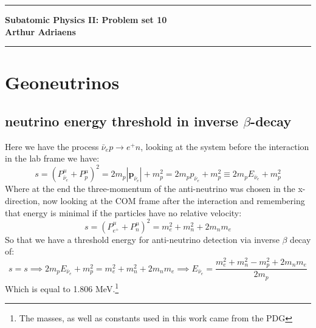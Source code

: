 \documentclass[10pt,a4paper,twoside]{article}
\begin{document}
	\begin{center}
		\hrule
		\vspace{.4cm}
		{\bf {\huge Subatomic Physics II: Problem set 10}}
		\vspace{.2cm}
		\\
		{\bf Arthur Adriaens}
		\vspace{.2cm}
		\hrule
	\end{center}
\section{Geoneutrinos}
\subsection{neutrino energy threshold in inverse $\beta$-decay}
Here we have the process $\bar{\nu}_ep\rightarrow e^+n$, looking at the system before the interaction in the lab frame we have:
\begin{equation}
	s = (P_{\bar{\nu}_e}^\mu + P_p^\mu)^2 = 2m_p|\boldsymbol{p}_{\bar{\nu}_e}| + m_p^2 = 2m_p p_{\bar{\nu}_e} + m_p^2 \equiv 2m_p E_{\bar{\nu}_e} + m_p^2
\end{equation}
Where at the end the three-momentum of the anti-neutrino was chosen in the x-direction, now looking at the COM frame after the interaction and remembering that energy is minimal if the particles have no relative velocity:
\begin{equation}
	s = (P_{e^+}^\mu + P_n^\mu)^2 = m_e^2 + m_n^2 + 2m_nm_e
\end{equation}
So that we have a threshold energy for anti-neutrino detection via inverse $\beta$ decay of:
\begin{equation}
	s=s \implies 2m_p E_{\bar{\nu}_e} + m_p^2 = m_e^2 + m_n^2 + 2m_nm_e \implies E_{\bar{\nu}_e} = \frac{m_e^2 + m_n^2 - m_p^2 + 2m_nm_e}{2m_p}
\end{equation}
Which is equal to 1.806 MeV.\footnote{The masses, as well as constants used in this work came from the PDG\cite{Group2020}}
\end{document}
